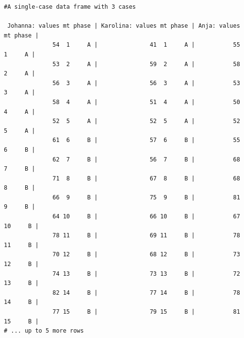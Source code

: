 \documentclass[
]{book}
\begin{document}
\begin{verbatim}
#A single-case data frame with 3 cases

 Johanna: values mt phase | Karolina: values mt phase | Anja: values mt phase |
              54  1     A |               41  1     A |           55  1     A |
              53  2     A |               59  2     A |           58  2     A |
              56  3     A |               56  3     A |           53  3     A |
              58  4     A |               51  4     A |           50  4     A |
              52  5     A |               52  5     A |           52  5     A |
              61  6     B |               57  6     B |           55  6     B |
              62  7     B |               56  7     B |           68  7     B |
              71  8     B |               67  8     B |           68  8     B |
              66  9     B |               75  9     B |           81  9     B |
              64 10     B |               66 10     B |           67 10     B |
              78 11     B |               69 11     B |           78 11     B |
              70 12     B |               68 12     B |           73 12     B |
              74 13     B |               73 13     B |           72 13     B |
              82 14     B |               77 14     B |           78 14     B |
              77 15     B |               79 15     B |           81 15     B |
# ... up to 5 more rows
\end{verbatim}
\end{document}
